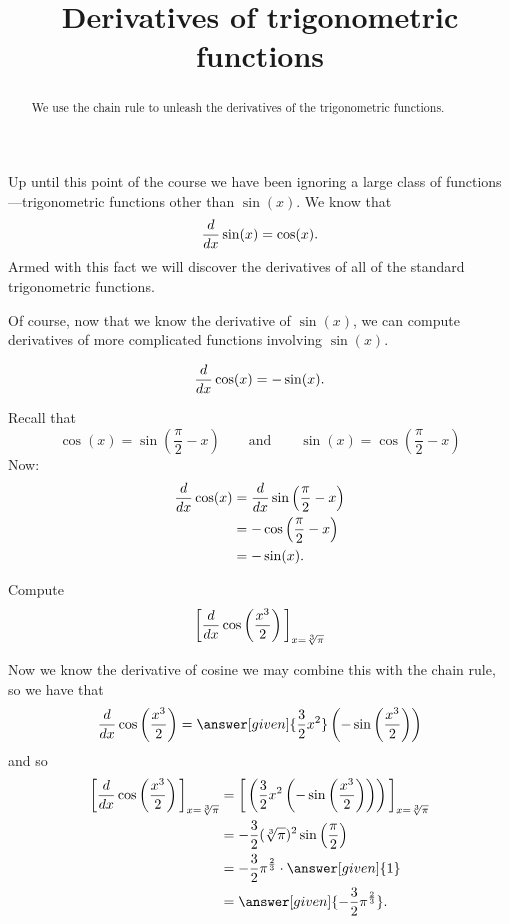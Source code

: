\documentclass{ximera}
\title[Dig-In:]{Derivatives of trigonometric functions}
\begin{document}
\begin{abstract}
  We use the chain rule to unleash the derivatives of the
  trigonometric functions.
\end{abstract}
\maketitle


Up until this point of the course we have been ignoring a large class
of functions---trigonometric functions other than $\sin(x)$. We know that
\[
\frac{d}{dx} \sin(x) = \cos(x).
\]
Armed with this fact we will discover the derivatives of all of the
standard trigonometric functions.


Of course, now that we know the derivative of $\sin(x)$, we can compute
derivatives of more complicated functions involving $\sin(x)$.


\begin{theorem}
\[
\frac{d}{dx} \cos(x) = -\sin(x).
\]
\begin{explanation}
Recall that
\[
\cos(x) = \sin\left(\frac{\pi}{2}-x\right)\qquad\text{and}\qquad \sin(x) = \cos\left(\frac{\pi}{2}-x\right)
\]
Now:
\begin{align*}
\frac{d}{dx} \cos(x) &= \frac{d}{dx} \sin\left(\frac{\pi}{2}-x\right)\\
&=-\cos\left(\frac{\pi}{2}-x\right) \\
&= -\sin(x).
\end{align*}
\end{explanation}
\end{theorem}

\begin{example}
Compute
\[
\bigg[ \frac{d}{dx} \cos \left( \frac{x^3}{2} \right) \bigg]_{x=\sqrt[3]{\pi}}
\]
\begin{explanation}
Now we know the derivative of cosine we may combine this with the
chain rule, so we have that
\[
\ddx \cos \left( \frac{x^3}{2} \right) = \answer[given]{\frac{3}{2} x^2} \left(- \sin \left( \frac{x^3}{2} \right) \right)
\]
and so
\begin{align*}
\eval{\ddx \cos \left( \frac{x^3}{2} \right)}_{x=\sqrt[3]{\pi}} &= \eval{\left( \frac{3}{2} x^2 \left(- \sin \left( \frac{x^3}{2} \right) \right) \right)}_{x=\sqrt[3]{\pi}}  \\
&= - \frac{3}{2} (\sqrt[3]{\pi})^2 \sin \left( \frac{\pi}{2} \right)  \\
&= - \frac{3}{2} \pi^{\frac{2}{3}} \cdot \answer[given]{1}  \\
&= \answer[given]{ - \frac{3}{2} \pi^{\frac{2}{3}}}.
\end{align*}
\end{explanation}
\end{example}
\end{document}
